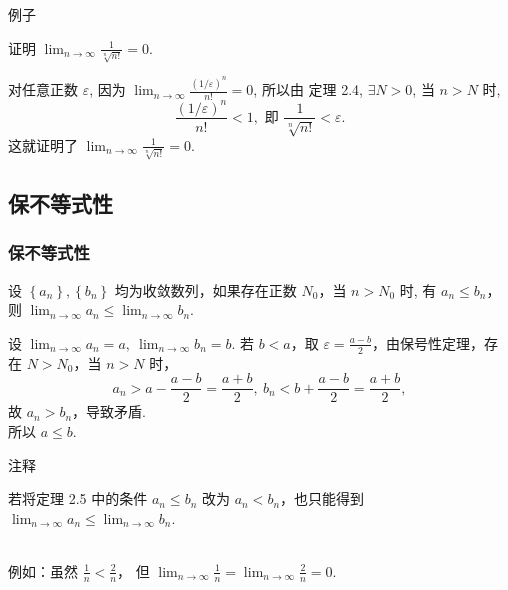 \documentclass[mathserif]{beamer}
\begin{document}
\begin{frame}{例子}%
	\begin{ex}
			\suojin 证明 $\lim _{n \rightarrow \infty} \frac{1}{\sqrt[n]{n !}}=0$.
		\end{ex}
	\pause 
	\begin{proofs}
		\suojin 对任意正数 $\varepsilon$, 因为 $\lim _{n \rightarrow \infty} \frac{(1 / \varepsilon)^n}{n !}=0$, 所以由 定理 2.4, $\exists N>0$, 当 $n>N$ 时,
	$$
	\frac{(1 / \varepsilon)^n}{n !}<1, \text { 即 } \frac{1}{\sqrt[n]{n !}}<\varepsilon . 
	$$
	这就证明了 $\lim _{n \rightarrow \infty} \frac{1}{\sqrt[n]{n !}}=0$.
    \end{proofs}
\end{frame}





\subsection{保不等式性}

\begin{frame}
\frametitle{保不等式性}
	\begin{thm}
		\suojin 设 $\left\{a_n\right\},\left\{b_n\right\}$ 均为收敛数列，如果存在正数 $N_0$，当 $n>N_0$ 时, 有 $a_n \leq b_n$，则 $\lim _{n \rightarrow \infty} a_n \leq \lim _{n \rightarrow \infty} b_n$.
		\end{thm}
	\pause 
	\begin{proofs}
		\suojin 设 $\lim _{n \rightarrow \infty} a_n=a,\ \lim _{n \rightarrow \infty} b_n=b$. 若 $b<a$，取 $\varepsilon=\frac{a-b}{2}$，由保号性定理，存在 $N>N_0$，当 $n>N$ 时，
	$$
	a_n>a-\frac{a-b}{2}=\frac{a+b}{2},~ b_n<b+\frac{a-b}{2}=\frac{a+b}{2},
	$$
	故 $a_n>b_n$，导致矛盾. \\
	\suojin 所以 $a \leqslant b$.   
    \end{proofs}
\end{frame}



\begin{frame}{注释}%
	\begin{alertblock}{}
	\suojin {} 若将定理 2.5 中的条件 $a_n \leq b_n$ 改为 $a_n<b_n$，也只能得到 $\lim _{n \rightarrow \infty} a_n \leq \lim _{n \rightarrow \infty} b_n$.
	\end{alertblock}
	\\
	\baselineskip
	\suojin 例如：虽然 $\frac{1}{n}<\frac{2}{n}$， 但 $\lim _{n \rightarrow \infty} \frac{1}{n}=\lim _{n \rightarrow \infty} \frac{2}{n}=0$.
	
\end{frame}
\end{document}
